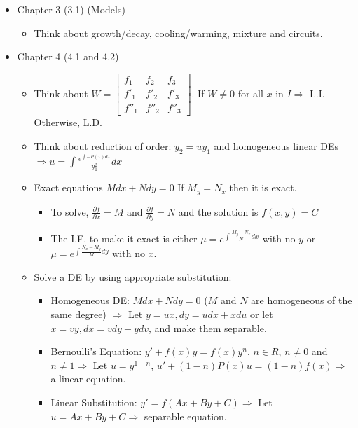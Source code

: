 \documentclass{article}
\newcommand{\p}{\partial}
\newcommand{\mathree}[9]{\begin{bmatrix} #1 & #2 & #3 \\ #4 & #5 & #6 \\ #7 & #8 & #9 \end{bmatrix}}
\begin{document}
\begin{itemize}
\begin{itemize}
    \end{itemize}
    \item Chapter 3 (3.1) (Models) \begin{itemize}
        \item Think about growth/decay, cooling/warming, mixture and circuits.
    \end{itemize}
    \item Chapter 4 (4.1 and 4.2) \begin{itemize}
        \item Think about $W=\mathree{f_1}{f_2}{f_3}{f'_1}{f'_2}{f'_3}{f''_1}{f''_2}{f''_3}$. If $W\neq0$ for all $x$ in $I\Rightarrow$ L.I. Otherwise, L.D.
        \item Think about reduction of order: $y_2=uy_1$ and homogeneous linear DEs $\Rightarrow u=\int\frac{e^{\int-P(x)dx}}{y^2_1}dx$
        \item Exact equations $Mdx+Ndy=0$ If $M_y=N_x$ then it is exact. \begin{itemize}
            \item To solve, $\frac{\p f}{\p x}=M$ and $\frac{\p f}{\p y}=N$ and the solution is $f(x,y)=C$
            \item The I.F. to make it exact is either $\mu=e^{\int\frac{M_y-N_x}{N}dx}$ with no $y$ or $\mu=e^{\int\frac{N_x-M_y}{M}dy}$ with no $x$.
        \end{itemize}
        \item Solve a DE by using appropriate substitution: \begin{itemize}
            \item Homogeneous DE: $Mdx+Ndy=0$ ($M$ and $N$ are homogeneous of the same degree) $\Rightarrow$ Let $y=ux,dy=udx+xdu$ or let $x=vy,dx=vdy+ydv$, and make them separable.
            \item Bernoulli's Equation: $y'+f(x)y=f(x)y^n$, $n\in R$, $n\neq0$ and $n\neq1\Rightarrow$ Let $u=y^{1-n}$, $u'+(1-n)P(x)u=(1-n)f(x)\Rightarrow$ a linear equation.
            \item Linear Substitution: $y'=f(Ax+By+C)\Rightarrow$ Let $u=Ax+By+C\Rightarrow$ separable equation.
        \end{itemize}
    \end{itemize}
\end{itemize}
\end{document}
